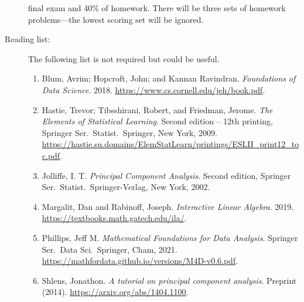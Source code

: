 \documentclass[a4paper, 12pt]{article}
\begin{document}
\begin{description}
    final exam and 40\% of homework. There will be three sets of homework problems---the lowest scoring set will be ignored. 
    \vspace{1cm}
    \item[Reading list:] The following list is not required but could be useful.
    \begin{enumerate} 
      \item Blum, Avrim; Hopcroft, John; and Kannan Ravindran.
      \textit{Foundations of Data Science}. 2018.
      \url{https://www.cs.cornell.edu/jeh/book.pdf}.
      \item Hastie, Trevor; Tibsshirani, Robert, and Friedman, Jerome. \textit{The Elements of Statistical Learning}. Second edition -- 12th printing, Springer Ser.\ Statist.\ Springer, New York, 2009. \url{https://hastie.su.domains/ElemStatLearn/printings/ESLII_print12_toc.pdf}.
      \item Jolliffe, I. T. \textit{Principal Component Analysis}. Second
      edition, Springer Ser.\ Statist.\ Springer-Verlag, New York, 2002.
      \item Margalit, Dan and Rabinoff, Joseph. \textit{Interactive Linear
      Algebra}. 2019. \url{https://textbooks.math.gatech.edu/ila/}.
      \item Phillips, Jeff M. \textit{Mathematical Foundations for Data Analysis}. Springer Ser.\ Data Sci.\ Springer, Cham, 2021. \url{https://mathfordata.github.io/versions/M4D-v0.6.pdf}.
      \item Shlens, Jonathon. \textit{A tutorial on principal component
      analysis}. Preprint (2014). \url{https://arxiv.org/abs/1404.1100}.
    \end{enumerate}
\end{description}
\end{document}
